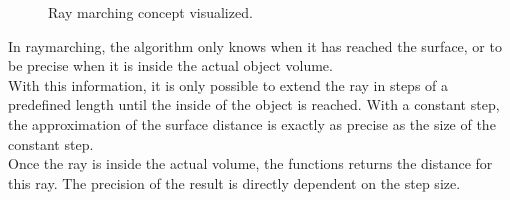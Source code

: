 \begin{figure}[H]
    \centering
    \caption{Ray marching concept visualized.}
\end{figure}

\pagebreak
\noindent
In \gls{raymarching}, the algorithm only knows when it has reached the surface, or to be precise when it is inside the actual object volume.
\\
With this information, it is only possible to extend the ray in steps of a predefined length until the inside of the object is reached.
With a constant step, the approximation of the surface distance is exactly as precise as the size of the constant step.
\\
Once the ray is inside the actual volume, the functions returns the distance for this ray. The precision of the result is directly dependent on the step size.

